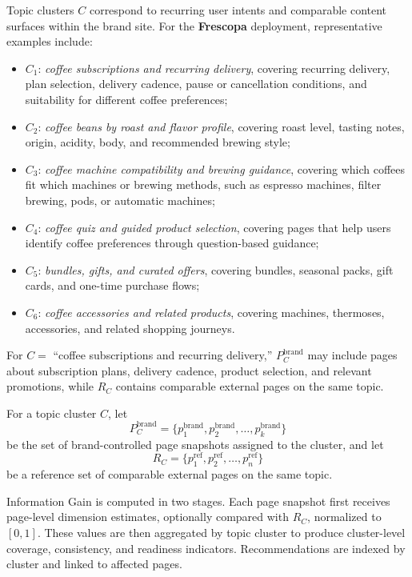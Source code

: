 \documentclass{article}
\begin{document}
Topic clusters \(C\) correspond to recurring user intents and comparable content surfaces within the brand site. For the \textbf{Frescopa} deployment, representative examples include:
\begin{itemize}
    \item \(C_1\): \textit{coffee subscriptions and recurring delivery}, covering recurring delivery, plan selection, delivery cadence, pause or cancellation conditions, and suitability for different coffee preferences;
    \item \(C_2\): \textit{coffee beans by roast and flavor profile}, covering roast level, tasting notes, origin, acidity, body, and recommended brewing style;
    \item \(C_3\): \textit{coffee machine compatibility and brewing guidance}, covering which coffees fit which machines or brewing methods, such as espresso machines, filter brewing, pods, or automatic machines;
    \item \(C_4\): \textit{coffee quiz and guided product selection}, covering pages that help users identify coffee preferences through question-based guidance;
    \item \(C_5\): \textit{bundles, gifts, and curated offers}, covering bundles, seasonal packs, gift cards, and one-time purchase flows;
    \item \(C_6\): \textit{coffee accessories and related products}, covering machines, thermoses, accessories, and related shopping journeys.
\end{itemize}

For \(C=\) ``coffee subscriptions and recurring delivery,'' \(P_C^{\text{brand}}\) may include pages about subscription plans, delivery cadence, product selection, and relevant promotions, while \(R_C\) contains comparable external pages on the same topic.

For a topic cluster \(C\), let
\[
P_C^{\text{brand}}=\{p_1^{\text{brand}},p_2^{\text{brand}},\dots,p_k^{\text{brand}}\}
\]
be the set of brand-controlled page snapshots assigned to the cluster, and let
\[
R_C = \{p_1^{\mathrm{ref}}, p_2^{\mathrm{ref}}, \dots, p_n^{\mathrm{ref}}\}
\]
be a reference set of comparable external pages on the same topic.

Information Gain is computed in two stages. Each page snapshot first receives page-level dimension estimates, optionally compared with \(R_C\), normalized to \([0,1]\). These values are then aggregated by topic cluster to produce cluster-level coverage, consistency, and readiness indicators. Recommendations are indexed by cluster and linked to affected pages.
\end{document}
